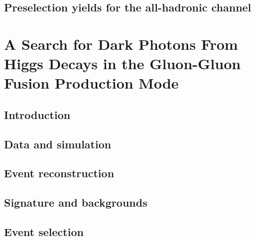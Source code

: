 \label{sec:multi_lepton_truth_study}
\section{Preselection yields for the all-hadronic channel}
\label{sec:allhad_preselection_yields}
\label{sec:allhad_abcd_method}



\chapter{A Search for Dark Photons From Higgs Decays in the Gluon-Gluon Fusion Production Mode}\label{ch:dark_photons}

\section{Introduction}
\label{sec:dark_photon_intro}


% 

\section{Data and simulation}
\label{sec:samples}

\FloatBarrier

\section{Event reconstruction} %
\label{sec:object-rec}

\FloatBarrier

\section{Signature and backgrounds}
\label{sec:signature}

\FloatBarrier

\section{Event selection} %
\label{sec:selections}

\FloatBarrier

